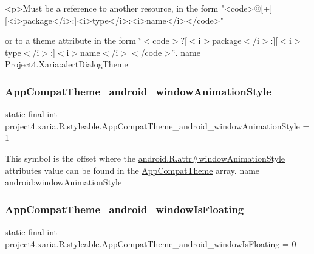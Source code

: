\begin{DoxyVerb}      <p>Must be a reference to another resource, in the form "<code>@[+][<i>package</i>:]<i>type</i>:<i>name</i></code>"
\end{DoxyVerb}
 or to a theme attribute in the form \char`\"{}$<$code$>$?\mbox{[}$<$i$>$package$<$/i$>$\+:\mbox{]}\mbox{[}$<$i$>$type$<$/i$>$\+:\mbox{]}$<$i$>$name$<$/i$>$$<$/code$>$\char`\"{}.  name Project4.\+Xaria\+:alert\+Dialog\+Theme \mbox{\label{classproject4_1_1xaria_1_1R_1_1styleable_a9cd010ea2199c7b2d3343acea12f21ce}} 
\subsubsection{\texorpdfstring{App\+Compat\+Theme\+\_\+android\+\_\+window\+Animation\+Style}{AppCompatTheme\_android\_windowAnimationStyle}}
{\footnotesize\ttfamily static final int project4.\+xaria.\+R.\+styleable.\+App\+Compat\+Theme\+\_\+android\+\_\+window\+Animation\+Style = 1\hspace{0.3cm}{\ttfamily [static]}}

This symbol is the offset where the \hyperlink{}{android.\+R.\+attr\#window\+Animation\+Style} attribute\textquotesingle{}s value can be found in the \hyperlink{classproject4_1_1xaria_1_1R_1_1styleable_aad8bec413e2350f9404e6ff0e831a85d}{App\+Compat\+Theme} array.  name android\+:window\+Animation\+Style \mbox{\label{classproject4_1_1xaria_1_1R_1_1styleable_a82f0023ac5cdc68430cb09e5f9ca2633}} 
\subsubsection{\texorpdfstring{App\+Compat\+Theme\+\_\+android\+\_\+window\+Is\+Floating}{AppCompatTheme\_android\_windowIsFloating}}
{\footnotesize\ttfamily static final int project4.\+xaria.\+R.\+styleable.\+App\+Compat\+Theme\+\_\+android\+\_\+window\+Is\+Floating = 0\hspace{0.3cm}{\ttfamily [static]}}

